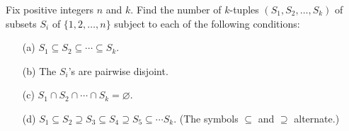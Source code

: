 Fix positive integers $n$ and $k$. Find the number of $k$-tuples $(S_1, S_2, \dots, S_k)$ of subsets $S_i$ of $\{1, 2, \dots , n\}$ subject to each of the following conditions:

\begin{enumerate}
	\item[(a)] $S_1 \subseteq S_2 \subseteq \cdots \subseteq S_k$.
	\item[(b)] The $S_i$'s are pairwise disjoint.
	\item[(c)] $S_1 \cap S_2 \cap \cdots \cap S_k = \varnothing$.
	\item[(d)] $S_1 \subseteq S_2 \supseteq S_3 \subseteq S_4 \supseteq S_5 \subseteq \cdots S_k$. (The symbols $\subseteq$ and $\supseteq$ alternate.)
\end{enumerate}
